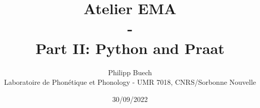 \documentclass[12pt,a4paper]{beamer}
\title{Atelier EMA\\ - \\Part II: Python and Praat}
\author{Philipp Buech\\{\scriptsize Laboratoire de Phonétique et Phonology - UMR 7018, CNRS/Sorbonne Nouvelle}}
\date{30/09/2022}
\begin{document}
\begin{frame}
    \maketitle\\
    
\end{frame}
\end{document}
